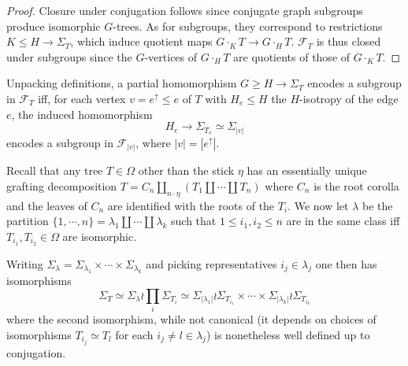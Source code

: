 \documentclass[a4paper,10pt]{article}%
\begin{document}
\begin{proof}

	Closure under conjugation follows since conjugate graph subgroups produce isomorphic $G$-trees.
	As for subgroups, they correspond to restrictions $K \leq H \to \Sigma_T$,
	which induce quotient maps 
	$G \cdot_K T \to G \cdot_H T$. 
	$\mathcal{F}_T$ is thus closed under subgroups since the $G$-vertices of $ G \cdot_H T$ are quotients of those of $G \cdot_K T$.

\end{proof}


\begin{remark}\label{UNPACKFTYPE REM}

Unpacking definitions, a partial homomorphism 
$G \geq H \to \Sigma_T$
encodes a subgroup in $\mathcal{F}_T$
iff, for each vertex $v= e^{\uparrow} \leq e$ of $T$ with 
$H_e \leq H$ the
$H$-isotropy of the edge $e$, the induced homomorphism
\begin{equation}\label{PARTIALHOMEDGE EQ}
H_e \to \Sigma_{T_{v}} \simeq 
\Sigma_{|v|}
\end{equation}
encodes a subgroup in $\mathcal{F}_{|v|}$, where $|v|=|e^{\uparrow}|$.

\end{remark}


\begin{remark}\label{TREEINDUCDESC REM}

Recall that any tree $T \in \Omega$ other than the stick $\eta$ has an essentially unique grafting decomposition
$T= C_n \amalg_{n \cdot \eta}(T_1 \amalg \cdots \amalg T_n)$ where $C_n$ is the root corolla and the leaves of $C_n$ are identified with the roots of the $T_i$. We now let 
$\lambda$ be the partition 
$\{1,\cdots,n\} = \lambda_1 \amalg\cdots \amalg \lambda_k$
 such that $1 \leq i_1, i_2 \leq n$ are in the same class iff
 $T_{i_1}, T_{i_2} \in \Omega$ are isomorphic.
 
 Writing 
 $\Sigma_{\lambda} = \Sigma_{\lambda_1} \times \cdots \times
 \Sigma_{\lambda_k}$
and picking representatives $i_j \in \lambda_j$ 
one then has isomorphisms
\begin{equation}\label{TREEISOT EQ}
	\Sigma_T \simeq \Sigma_{\lambda} \wr \prod_{i} \Sigma_{T_i}
		\simeq
	\Sigma_{|\lambda_1|} \wr \Sigma_{T_{i_1}}
		\times \cdots \times	
	\Sigma_{|\lambda_k|} \wr \Sigma_{T_{i_k}}
\end{equation}
where the second isomorphism, while not canonical 
(it depends on choices of isomorphisms $T_{i_j} \simeq T_l$ for each $i_j \neq l \in \lambda_j$) is nonetheless well defined up to conjugation.

\end{remark}
\end{document}
